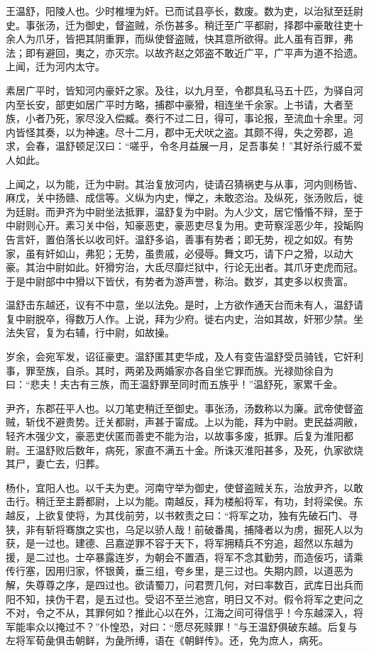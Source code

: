 \documentclass[]{article}
\begin{document}
王温舒，阳陵人也。少时椎埋为奸。已而试县亭长，数废。数为吏，以治狱至廷尉史。事张汤，迁为御史，督盗贼，杀伤甚多。稍迁至广平都尉，择郡中豪敢往吏十余人为爪牙，皆把其阴重罪，而纵使督盗贼，快其意所欲得。此人虽有百罪，弗法；即有避回，夷之，亦灭宗。以故齐赵之郊盗不敢近广平，广平声为道不拾遗。上闻，迁为河内太守。

素居广平时，皆知河内豪奸之家。及往，以九月至，令郡具私马五十匹，为驿自河内至长安，部吏如居广平时方略，捕郡中豪猾，相连坐千余家。上书请，大者至族，小者乃死，家尽没入偿臧。奏行不过二日，得可，事论报，至流血十余里。河内皆怪其奏，以为神速。尽十二月，郡中无犬吠之盗。其颇不得，失之旁郡，追求，会春，温舒顿足汉曰：``嗟乎，令冬月益展一月，足吾事矣！''其好杀行威不爱人如此。

上闻之，以为能，迁为中尉。其治复放河内，徒请召猜祸吏与从事，河内则杨皆、麻戊，关中扬赣、成信等。义纵为内史，惮之，未敢恣治。及纵死，张汤败后，徙为廷尉。而尹齐为中尉坐法抵罪，温舒复为中尉。为人少文，居它惛惛不辩，至于中尉则心开。素习关中俗，知豪恶吏，豪恶吏尽复为用。吏苛察淫恶少年，投缿购告言奸，置伯落长以收司奸。温舒多谄，善事有势者；即无势，视之如奴。有势家，虽有奸如山，弗犯；无势，虽贵戚，必侵辱。舞文巧，请下户之猾，以动大豪。其治中尉如此。奸猾穷治，大氐尽靡烂狱中，行论无出者。其爪牙吏虎而冠。于是中尉部中中猾以下皆伏，有势者为游声誉，称治。数岁，其吏多以权贵富。

温舒击东越还，议有不中意，坐以法免。是时，上方欲作通天台而未有人，温舒请复中尉脱卒，得数万人作。上说，拜为少府。徙右内史，治如其故，奸邪少禁。坐法失官，复为右辅，行中尉，如故操。

岁余，会宛军发，诏征豪吏。温舒匿其吏华成，及人有变告温舒受员骑钱，它奸利事，罪至族，自杀。其时，两弟及两婚家亦各自坐它罪而族。光禄勋徐自为曰：``悲夫！夫古有三族，而王温舒罪至同时而五族乎！''温舒死，家累千金。

尹齐，东郡茌平人也。以刀笔吏稍迁至御史。事张汤，汤数称以为廉。武帝使督盗贼，斩伐不避贵势。迁关都尉，声甚于甯成。上以为能，拜为中尉。吏民益凋敝，轻齐木强少文，豪恶吏伏匿而善吏不能为治，以故事多废，抵罪。后复为淮阳都尉。王温舒败后数年，病死，家直不满五十金。所诛灭淮阳甚多，及死，仇家欲烧其尸，妻亡去，归葬。

杨仆，宜阳人也。以千夫为吏。河南守举为御史，使督盗贼关东，治放尹齐，以敢击行。稍迁至主爵都尉，上以为能。南越反，拜为楼船将军，有功，封将梁侯。东越反，上欲复使将，为其伐前劳，以书敕责之曰：``将军之功，独有先破石门、寻狭，非有斩将骞旗之实也，乌足以骄人哉！前破番禺，捕降者以为虏，掘死人以为获，是一过也。建德、吕嘉逆罪不容于天下，将军拥精兵不穷追，超然以东越为援，是二过也。士卒暴露连岁，为朝会不置酒，将军不念其勤劳，而造佞巧，请乘传行塞，因用归家，怀银黄，垂三组，夸乡里，是三过也。失期内顾，以道恶为解，失尊尊之序，是四过也。欲请蜀刀，问君贾几何，对曰率数百，武库日出兵而阳不知，挟伪干君，是五过也。受诏不至兰池宫，明日又不对。假令将军之吏问之不对，令之不从，其罪何如？推此心以在外，江海之间可得信乎！今东越深入，将军能率众以掩过不？''仆惶恐，对曰：``愿尽死赎罪！''与王温舒俱破东越。后复与左将军荀彘俱击朝鲜，为彘所缚，语在《朝鲜传》。还，免为庶人，病死。
\end{document}

